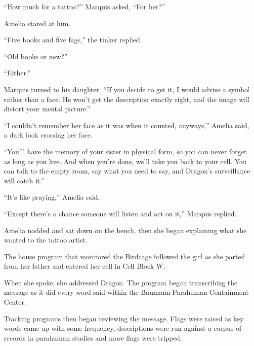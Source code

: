 ``How much for a tattoo?'' Marquis asked, ``For her?''



Amelia stared at him.



``Five books and five fags,'' the tinker replied.



``Old books or new?''



``Either.''



Marquis turned to his daughter.  ``If you decide to get it, I would advise a symbol rather than a face.  He won't get the description exactly right, and the image will distort your mental picture.''



``I couldn't remember her face as it was when it counted, anyways,'' Amelia said, a dark look crossing her face.



``You'll have the memory of your sister in physical form, so you can never forget as long as you live.  And when you're done, we'll take you back to your cell.  You can talk to the empty room, say what you need to say, and Dragon's surveillance will catch it.''



``It's like praying,'' Amelia said.



``Except there's a chance someone will listen and act on it,'' Marquis replied.



Amelia nodded and sat down on the bench, then she began explaining what she wanted to the tattoo artist.



\sectionbreak



The house program that monitored the Birdcage followed the girl as she parted from her father and entered her cell in Cell Block W.



When she spoke, she addressed Dragon.  The program began transcribing the message as it did every word said within the Baumann Parahuman Containment Center.



Tracking programs then began reviewing the message.  Flags were raised as key words came up with some frequency, descriptions were run against a corpus of records in parahuman studies and more flags were tripped.



